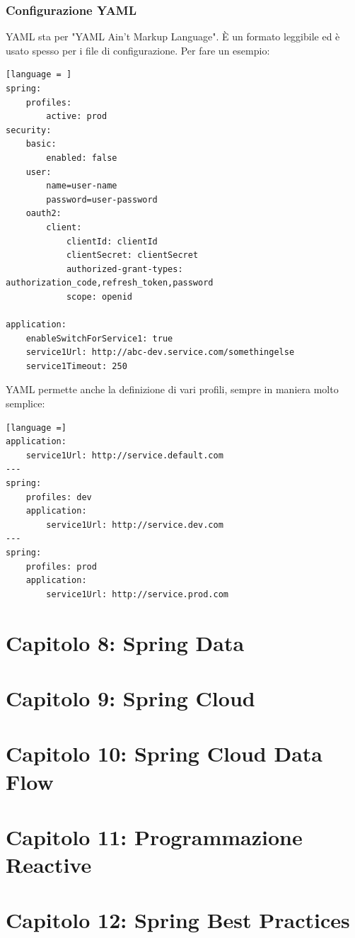 \documentclass[11pt,a4paper]{book}
\begin{document}
\subsubsection{Configurazione YAML}
YAML sta per "YAML Ain't Markup Language". È un formato leggibile ed è usato spesso per i file di configurazione. Per fare un esempio:
\begin{lstlisting}[language = ]
spring:
	profiles:
		active: prod
security:
	basic:
		enabled: false
	user:
		name=user-name
		password=user-password
	oauth2:
		client:
			clientId: clientId
			clientSecret: clientSecret
			authorized-grant-types: authorization_code,refresh_token,password
			scope: openid

application:
	enableSwitchForService1: true
	service1Url: http://abc-dev.service.com/somethingelse
	service1Timeout: 250
\end{lstlisting}

YAML permette anche la definizione di vari profili, sempre in maniera molto semplice:
\begin{lstlisting}[language =]
application:
	service1Url: http://service.default.com
---
spring:
	profiles: dev
	application:
		service1Url: http://service.dev.com
---
spring:
	profiles: prod
	application:
		service1Url: http://service.prod.com
\end{lstlisting}


\section{Capitolo 8: Spring Data}

\section{Capitolo 9: Spring Cloud}

\section{Capitolo 10: Spring Cloud Data Flow}

\section{Capitolo 11: Programmazione Reactive}

\section{Capitolo 12: Spring Best Practices}
\end{document}
